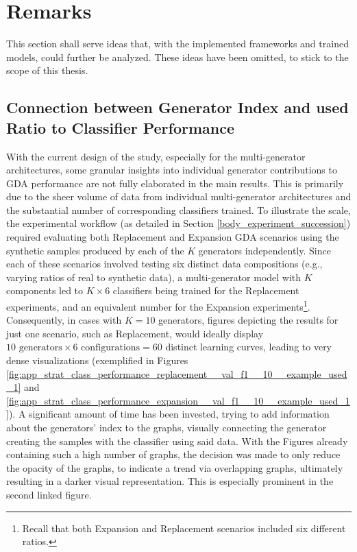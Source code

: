 \section{Remarks} \label{chapter_remarks}
This section shall serve ideas that, with the implemented frameworks and trained models, could further be analyzed. These ideas have been omitted, to stick to the scope of this thesis. 

\subsection{Connection between Generator Index and used Ratio to Classifier Performance}
\noindent \noindent With the current design of the study, especially for the multi-generator architectures, some granular insights into individual generator contributions to GDA performance are not fully elaborated in the main results. This is primarily due to the sheer volume of data from individual multi-generator architectures and the substantial number of corresponding classifiers trained. To illustrate the scale, the experimental workflow (as detailed in Section \ref{body_experiment_succession}) required evaluating both Replacement and Expansion GDA scenarios using the synthetic samples produced by each of the $K$ generators independently. Since each of these scenarios involved testing six distinct data compositions (e.g., varying ratios of real to synthetic data), a multi-generator model with $K$ components led to $K \times 6$ classifiers being trained for the Replacement experiments, and an equivalent number for the Expansion experiments\footnote{Recall that both Expansion and Replacement scenarios included six different ratios.}. Consequently, in cases with $K=10$ generators, figures depicting the results for just one scenario, such as Replacement, would ideally display $10 \text{ generators} \times 6 \text{ configurations} = 60$ distinct learning curves, leading to very dense visualizations (exemplified in Figures \ref{fig:app_strat_class_performance_replacement__val_f1__10__example_used_1} and \ref{fig:app_strat_class_performance_expansion__val_f1__10__example_used_1}). A significant amount of time has been invested, trying to add information about the generators' index to the graphs, visually connecting the generator creating the samples with the classifier using said data. With the Figures already containing such a high number of graphs, the decision was made to only reduce the opacity of the graphs, to indicate a trend via overlapping graphs, ultimately resulting in a darker visual representation. This is especially prominent in the second linked figure.

